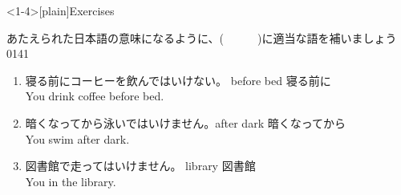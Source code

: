 \documentclass[aspectratio=169,xcolor={dvipsnames,table}]{beamer}
\newcommand{\myaudio}[1]{\href{#1}{\faVolumeUp}}
\begin{document}
\begin{frame}<1-4>[plain]{Exercises}
 
あたえられた日本語の意味になるように、(~~~~~~)に適当な語を補いましょう
\hfill{\tiny 0141}\,{\scriptsize \myaudio{./audio/013_must_05.mp3}}


\begin{enumerate}
 \item {\small 寝る前にコーヒーを飲んではいけない。}%
\hfill{}{\scriptsize before bed 寝る前に}\\
You  drink coffee before bed.
 \item {\small 暗くなってから泳いではいけません。}\hfill{}{\scriptsize after dark 暗くなってから}\\
 You  swim after dark.
 \item {\small 図書館で走ってはいけません。}%
\hfill{}{\scriptsize library  図書館}\\
 You   in the library.
\end{enumerate}
\end{frame}
\end{document}
